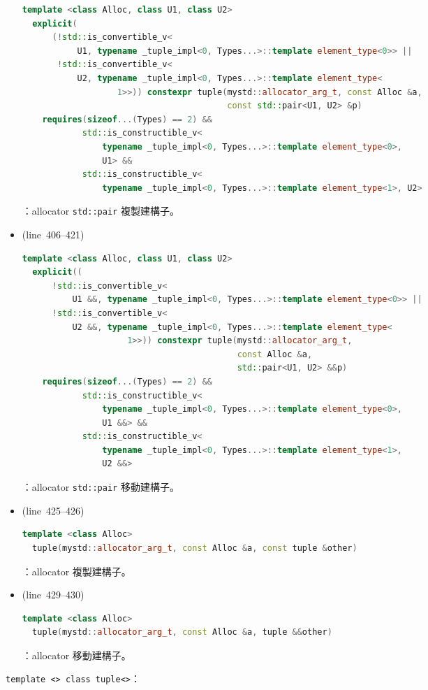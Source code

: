 \documentclass[a4paper,12pt]{article}
\begin{document}
\begin{itemize}
\begin{lstlisting}[language=C++]
  template <class Alloc, class U1, class U2>
  explicit(
      (!std::is_convertible_v<
           U1, typename _tuple_impl<0, Types...>::template element_type<0>> ||
       !std::is_convertible_v<
           U2, typename _tuple_impl<0, Types...>::template element_type<
                   1>>)) constexpr tuple(mystd::allocator_arg_t, const Alloc &a,
                                         const std::pair<U1, U2> &p)
    requires(sizeof...(Types) == 2) &&
            std::is_constructible_v<
                typename _tuple_impl<0, Types...>::template element_type<0>,
                U1> &&
            std::is_constructible_v<
                typename _tuple_impl<0, Types...>::template element_type<1>, U2>
\end{lstlisting}
：allocator \verb|std::pair| 複製建構子。
\item (line~406--421)
\begin{lstlisting}[language=C++]
  template <class Alloc, class U1, class U2>
  explicit((
      !std::is_convertible_v<
          U1 &&, typename _tuple_impl<0, Types...>::template element_type<0>> ||
      !std::is_convertible_v<
          U2 &&, typename _tuple_impl<0, Types...>::template element_type<
                     1>>)) constexpr tuple(mystd::allocator_arg_t,
                                           const Alloc &a,
                                           std::pair<U1, U2> &&p)
    requires(sizeof...(Types) == 2) &&
            std::is_constructible_v<
                typename _tuple_impl<0, Types...>::template element_type<0>,
                U1 &&> &&
            std::is_constructible_v<
                typename _tuple_impl<0, Types...>::template element_type<1>,
                U2 &&>
\end{lstlisting}
：allocator \verb|std::pair| 移動建構子。
\item (line~425--426)
\begin{lstlisting}[language=C++]
  template <class Alloc>
  tuple(mystd::allocator_arg_t, const Alloc &a, const tuple &other)
\end{lstlisting}
：allocator 複製建構子。
\item (line~429--430)
\begin{lstlisting}[language=C++]
  template <class Alloc>
  tuple(mystd::allocator_arg_t, const Alloc &a, tuple &&other)
\end{lstlisting}
：allocator 移動建構子。
\end{itemize}
\verb|template <> class tuple<>|：
\end{document}
